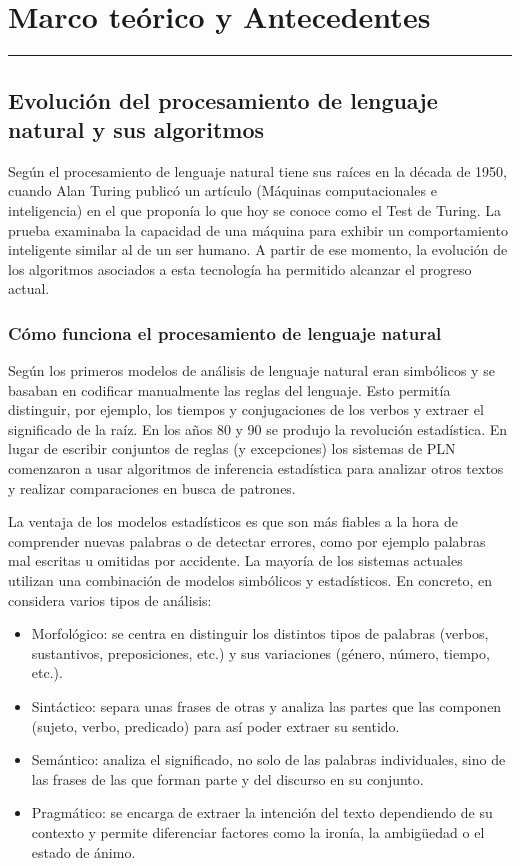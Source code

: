 \chapter{Marco teórico y Antecedentes }
\hrule \bigskip \vspace*{1cm}
\section{Evolución del procesamiento de lenguaje natural y sus algoritmos}

Según \cite{EvolucionPLN} el procesamiento de lenguaje natural tiene sus raíces en la década de 1950, cuando Alan Turing publicó un artículo (Máquinas computacionales e inteligencia) en el que proponía lo que hoy se conoce como el Test de Turing. La prueba examinaba la capacidad de una máquina para exhibir un comportamiento inteligente similar al de un ser humano. A partir de ese momento, la evolución de los algoritmos asociados a esta tecnología ha permitido alcanzar el progreso actual.

\subsection{Cómo funciona el procesamiento de lenguaje natural}

Según \cite{EvolucionPLN} los primeros modelos de análisis de lenguaje natural eran simbólicos y se basaban en codificar manualmente las reglas del lenguaje. Esto permitía distinguir, por ejemplo, los tiempos y conjugaciones de los verbos y extraer el significado de la raíz. En los años 80 y 90 se produjo la revolución estadística. En lugar de escribir conjuntos de reglas (y excepciones) los sistemas de PLN comenzaron a usar algoritmos de inferencia estadística para analizar otros textos y realizar comparaciones en busca de patrones.

La ventaja de los modelos estadísticos es que son más fiables a la hora de comprender nuevas palabras o de detectar errores, como por ejemplo palabras mal escritas u omitidas por accidente. La mayoría de los sistemas actuales utilizan una combinación de modelos simbólicos y estadísticos. En concreto, en \cite{EvolucionPLN} considera varios tipos de análisis:
\begin{itemize}
  \item Morfológico: se centra en distinguir los distintos tipos de palabras (verbos, sustantivos, preposiciones, etc.) y sus variaciones (género, número, tiempo, etc.).
  \item Sintáctico: separa unas frases de otras y analiza las partes que las componen (sujeto, verbo, predicado) para así poder extraer su sentido.
  \item Semántico: analiza el significado, no solo de las palabras individuales, sino de las frases de las que forman parte y del discurso en su conjunto.
  \item Pragmático: se encarga de extraer la intención del texto dependiendo de su contexto y permite diferenciar factores como la ironía, la ambigüedad o el estado de ánimo.
\end{itemize}




